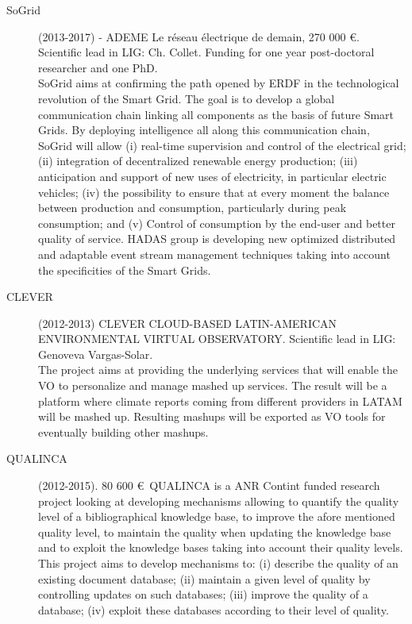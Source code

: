 \begin{description}
\item[SoGrid]  (2013-2017) - ADEME Le r{\'e}seau  {\'e}lectrique de demain, 270 000 \euro. Scientific lead in LIG: Ch. Collet. Funding for one year post-doctoral researcher and one PhD. \\
SoGrid aims at confirming the path opened by ERDF in the technological revolution of the Smart Grid. The goal is to develop a global communication chain linking all components as the basis of future Smart Grids. By deploying intelligence all along this communication chain, SoGrid will allow (i) real-time supervision and control of the electrical grid; (ii) integration of decentralized renewable energy production; (iii) anticipation and support of new uses of electricity, in particular electric vehicles; (iv) the possibility to ensure that at every moment the  balance between production and consumption, particularly during peak consumption;  and (v) Control of consumption by the end-user and better quality of service. HADAS group is developing new optimized distributed and adaptable event stream management techniques taking into account the specificities of the Smart Grids.

\item[CLEVER] (2012-2013)  CLEVER CLOUD-BASED LATIN-AMERICAN ENVIRONMENTAL VIRTUAL OBSERVATORY. Scientific lead in LIG: Genoveva Vargas-Solar. \\
The project aims at providing the underlying services that will enable the VO to personalize and manage mashed up services. The result will be a platform where climate reports coming from different providers in LATAM will be mashed up. Resulting mashups will be exported as VO tools for eventually building other mashups.

\item[QUALINCA] (2012-2015). 80 600 \euro\ QUALINCA is a ANR Contint funded research project looking at developing mechanisms allowing to quantify the quality level of a bibliographical knowledge base, to improve the afore mentioned quality level, to maintain the quality when updating the knowledge base and to exploit the knowledge bases taking into account their quality levels. This project aims to develop mechanisms to: (i) describe the quality of an existing document database; (ii) maintain a given level of quality by controlling updates on such databases; (iii) improve the quality of a database; (iv) exploit these databases according to their level of quality.


\end{description}
